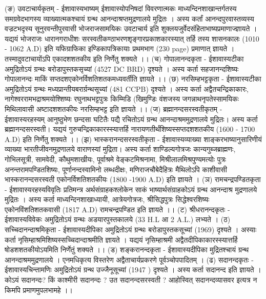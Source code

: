 (ङ) उवटाचार्यकृतम् - ईशावास्यभाष्यम् 
ईशावास्योपनिषदां विवरणात्मकः माध्यन्दिनशाखान्तर्गतस्य समग्रवेदभागस्य व्याख्यात्मकश्चायं ग्रन्थ आनन्दाश्रप्तमुद्रणालये मुद्रितः । अस्य कर्तां आनन्दपुरवास्तव्यस्य वज्रटभदृस्य सूनुरवन्तीपुरवासी भोजराजसामयिकः उवटाचार्य इति शुक्लयजुर्वेदसंहिताभाष्यप्रमाणाज्ज्ञायते । यद्ययं भोजराजः धारानगराधीशः सरस्वतीकण्ठाभरणशृङ्गारप्रकाशकारस्यात् तर्हि तस्य शासनकालः (1010 - 1062 A.D) इति यफिग्राफिका इण्डिकापत्रिकायाः प्रथमभाग (230 page) प्रमाणात् ज्ञायते । तस्मादुवटाचायोंऽपि एकादशशतकीय इति निर्णेतु शक्यते ।। 
(च) गोपालानन्दकृता - ईशावास्यटीका 
अमुद्रितोऽयं ग्रन्थः बरोडापुस्तकसृच्यां (4527 DC BRD) दृश्यते । अस्य कर्ता सहजानन्दशिष्यः गोपालानन्दः माकिं सप्तदशएकोनर्विशतिशतकमध्यवर्तीति ज्ञायते ।। 
(छ) नरसिम्हभट्टकृता - ईशावास्यटीका 
अमुद्रितोऽयं ग्रन्थः मध्यप्रान्तीयबरार्ग्रन्थसूच्यां (481 CCPB) दृश्यते । अस्य कर्ता अद्वैतचन्द्रिकाकारः, नागेश्वररामभद्राश्रमयोश्शिष्यः रघुनाथभट्टपुत्रः किम्मिडि (खिमुण्डिः वंशजस्य जगन्नाथनृपतेस्सामयिकः मिथिलावासी अष्टादशशतकीयः नरसिम्हभट्ट इति ज्ञायते ।।
(ज) ब्रह्मानन्दसरस्वतीकृतम् - ईशावास्यरहस्यम् 
आनुष्ठुभेण छन्दसा घटितैः पद्यै रचितोऽयं ग्रन्थ आनन्दाश्रममुद्रणालये मुद्रितः। अस्य कर्ता ब्रह्मानन्दसरस्वती। यद्ययं गुरुचन्द्रिकाकारस्स्यात्तर्हि नारायणतीर्थंशिष्यस्सप्तदशशतकीय (1600 - 1700 A.D) इति निर्णेतु शक्यते ।।
(झ) भास्करानन्दसरस्वतीकृता - ईशावास्यव्याख्या 
शाङ्करभाष्यानुसारिणीयं व्याख्या भारतीजीवनमुद्रणालये वाराणस्यां मुद्रिता। अस्य कर्ता शाण्डिल्यगोत्रजः कान्यगुब्जब्राह्मणः, गोभिलसूत्री, सामवेदी, कौथुमशाखीयः, पूर्वाश्रमे वेङ्कटमिश्रनामा, मिश्रीलालमिश्रपुण्यमत्योः पुत्रः अनन्तरामपण्डितशिष्यः, पूर्णानन्दस्वामिनो लब्धदीक्षः, मणिराजचौबेदैहित्रः मैथिलोऽपि काशीवासी भास्करानन्दसरस्वती एकोनर्विशतिशतकीयः (1800 -1900 A.D) इति ज्ञायते ।
(ञ) रामचन्द्रपण्डितकृता - ईशावास्यरहस्यविवृतिः 
प्रतिमन्त्र अर्थसंग्राहकश्लोकेन साकं भाष्यार्थसंग्राहकोऽयं ग्रन्थ आनन्दाश्र मुद्रणालये मुद्रितः । अस्य कर्ता माध्यन्दिनशाखाध्यायी, आत्रेयगोत्रजः, श्रीसिद्धपुत्रः सिद्धेश्वरशिष्यः एकोनविंशतिशतकवासी (1817 A.D) रामचन्द्रपण्डित इति ज्ञायते ।। 
(ट) श्रीधरानन्दकृतः - ईशावास्यविवेकः 
अमुद्रितोऽयं ग्रन्थः अडयारपुस्तकालये (33 H.L आ 2 A.L.) लभ्यते । 
(ठ) सच्चिदानन्दाश्रमिकृता - ईशावास्यदीपिका 
अमुद्रितोऽयं ग्रन्थः बरोडापुस्तकसूच्यां (1969) दृश्यते । अस्याः कर्ता नृसिम्हाश्रमिशिष्यस्सच्चिदान्दाश्रमीति ज्ञायते । यद्ययं नृसिम्हाश्रमी अद्वैतदीपिकाकारस्स्यात्तर्हि षोडशशतकीयोऽयमिति निर्णेतुं शक्यते ।। 
(ड) शङ्करानन्दकृता - ईशावास्यदीपिका 
मुद्रितश्चायं ग्रन्थ आनन्दाश्रममुद्रणालये । एनमधिकृत्य विस्तरेण अद्वैताचार्यप्रकरणे पूर्वञ्चोपपादितम् । 
(ढ) सदानन्दकृतः - ईशावास्यचिन्तामणिः
अमुद्रितोऽयं ग्रन्थ उज्जैनूसूच्यां (1947 ) दृश्यते । अस्य कर्ता सदानन्द इति ज्ञायते । कोऽयं सदानन्दः? किं काश्मीरी सदानन्दः ? उत सदानन्दसरस्वती ? आहोस्वित् सदानन्दव्यासवर इत्यत्र न किमपि प्रमाणमुपलभामहे ।। 
